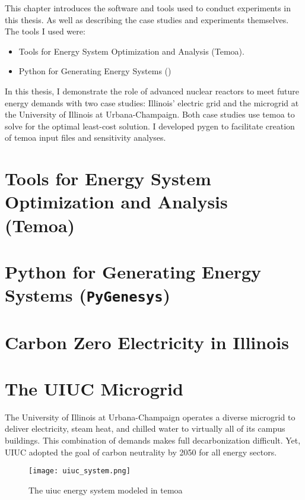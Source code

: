 This chapter introduces the software and tools used to conduct experiments in this
thesis. As well as describing the case studies and experiments themselves.
The tools I used were:
\begin{itemize}
  \item Tools for Energy System Optimization and Analysis (Temoa).
  \item Python for Generating Energy Systems (\pygen)
\end{itemize}
In this thesis, I demonstrate the role of advanced nuclear reactors to meet future
energy demands with two case studies: Illinois’ electric grid and the microgrid
at the University of Illinois at Urbana-Champaign. Both case studies use \gls{temoa}
to solve for the optimal least-cost solution. I developed \gls{pygen} to
facilitate creation of \gls{temoa} input files and sensitivity analyses.

\section{Tools for Energy System Optimization and Analysis (Temoa)}


\section{Python for Generating Energy Systems (\texttt{PyGenesys})}



\section{Carbon Zero Electricity in Illinois}
\label{section:ilmodel}


\section{The UIUC Microgrid}

The University of Illinois at Urbana-Champaign operates a diverse microgrid to
deliver electricity, steam heat, and chilled water to virtually all of its
campus buildings. This combination of demands makes full decarbonization difficult.
Yet, UIUC adopted the goal of carbon neutrality by 2050 for all energy sectors.

\begin{figure}[H]
  \texttt{[image: uiuc\_system.png]}
  \caption{The \gls{uiuc} energy system modeled in \gls{temoa}}
  \label{fig:uiucsys}
\end{figure}

